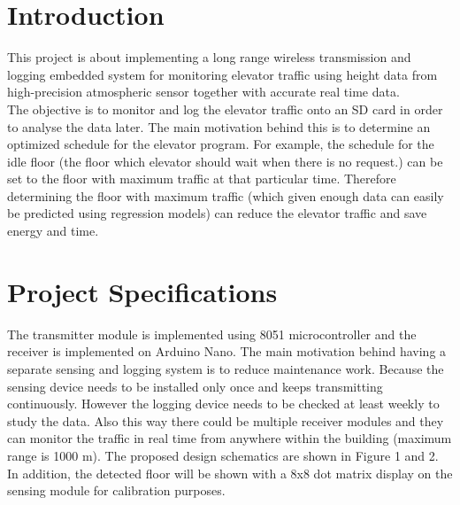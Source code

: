 \documentclass[12pt]{article}
\begin{document}
\section{Introduction}
This project is about implementing a long range wireless transmission and logging embedded system for monitoring elevator traffic using height data from high-precision atmospheric sensor together with accurate real time data.\\
The objective is to monitor and log the elevator traffic onto an SD card in order to analyse the data later. The main motivation behind this is to determine an optimized schedule for the elevator program. For example, the schedule for the idle floor (the floor which elevator should wait when there is no request.) can be set to the floor with maximum traffic at that particular time. Therefore determining the floor with maximum traffic (which given enough data can easily be predicted using regression models) can reduce the elevator traffic and save energy and time.
\section{Project Specifications}
The transmitter module is implemented using 8051 microcontroller and the receiver is implemented on Arduino Nano. The main motivation behind having a separate sensing and logging system is to reduce maintenance work. Because the sensing device needs to be installed only once and keeps transmitting continuously. However the logging device needs to be checked at least weekly to study the data. Also this way there could be multiple receiver modules and they can monitor the traffic in real time from anywhere within the building (maximum range is 1000 m). The proposed design schematics are shown in Figure 1 and 2. In addition, the detected floor will be shown with a 8x8 dot matrix display on the sensing module for calibration purposes.
\end{document}
